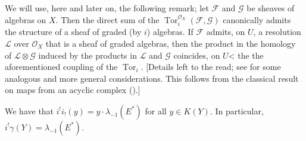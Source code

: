 \documentclass{article}
\theoremstyle{plain}
\newenvironment{proposition}[1]
    {\renewcommand\theinnerproposition{#1}\innerproposition}
    {\endinnerproposition}
\theoremstyle{definition}
\newcommand{\scr}[1]{{\mathscr{#1}}}
\DeclareMathOperator{\Tor}{Tor}
\begin{document}
\subsection{}
\label{subsection10d}

We will use, here and later on, the following remark;
let $\scr{F}$ and $\scr{G}$ be sheaves of algebras on $X$.
Then the direct sum of the $\Tor_i^{\scr{O}_X}(\scr{F},\scr{G})$ canonically admits the structure of a sheaf of graded (by $i$) algebras.
If $\scr{F}$ admits, on $U$, a resolution $\scr{L}$ over $\scr{O}_X$ that is a sheaf of graded algebras, then the product in the homology of $\scr{L}\otimes\scr{G}$ induced by the products in $\scr{L}$ and $\scr{G}$ coincides, on $U$< the the aforementioned coupling of the $\Tor_i$.
[Details left to the read;
see \cite[chap.~IX]{3} for some analogous and more general considerations.
This follows from the classical result on maps from an acyclic complex (\cite[proposition~11, p.~76]{3}).]

\begin{proposition}{12}
\label{proposition12}
  We have that $i^!i_!(y)=y\cdot\lambda_{-1}(E^*)$ for all $y\in K(Y)$.
  In particular, $i^!\gamma(Y)=\lambda_{-1}(E^*)$.
\end{proposition}
\end{document}
